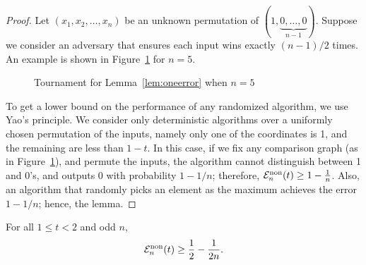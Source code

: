 \documentclass[twoside,11pt]{article}
\newcommand{\cE}{\mathcal{E}}
\newcommand{\pe}{\cE}
\newcommand{\nonadaptive}{\textnormal{non}}
\begin{document}
\begin{proof}
 Let $(x_1,x_2,\ldots,x_n)$ be an unknown permutation of
 $(1,\underbrace{0,\ldots,0}_{n-1})$. Suppose we consider an
 adversary that ensures each input wins exactly $(n-1)/2$ times. An
 example is shown in Figure~\ref{fig:tournament_for_error_one} for
 $n=5$. 
\begin{figure}
\begin{center}
\end{center}
 \caption{Tournament for Lemma~\ref{lem:oneerror} when $n=5$}
 \label{fig:tournament_for_error_one}
\end{figure}

To get a lower bound on the performance of any randomized algorithm,
we use Yao's principle. We consider only deterministic algorithms over
a uniformly chosen permutation of the inputs, namely only one of the
coordinates is 1, and the remaining are less than $1-t$. In this case, if
we fix any comparison graph (as in Figure~\ref{fig:tournament_for_error_one}), and permute the
inputs, the algorithm cannot distinguish between 1 and $0$'s, and
outputs $0$ with probability $1-1/n$; therefore, 
$\pe_n^{\nonadaptive}(t) \ge 1-\frac1n$. Also, an algorithm that
randomly picks an element as the maximum achieves the error $1-1/n$; 
hence, the lemma.
\end{proof}
\begin{lemma}
 \label{lem:twoerror}
For all $1 \le t<2$ and odd $n$,
$$\pe_n^{\nonadaptive}(t)\ge \frac12-\frac1{2n}.$$ 
\end{lemma}
\end{document}
